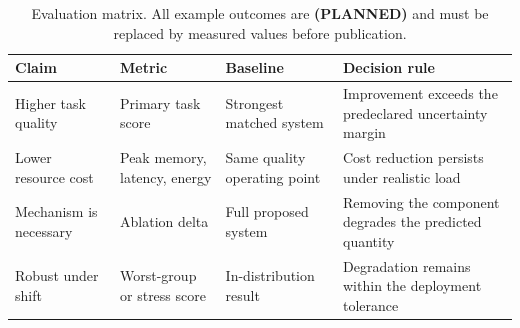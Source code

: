 \begin{table}[htbp]
\centering
\caption{Evaluation matrix. All example outcomes are \textbf{(PLANNED)} and
must be replaced by measured values before publication.}
\label{tab:evaluation-plan}
\small
\renewcommand{\arraystretch}{1.25}
\begin{tabularx}{\textwidth}{@{}L{0.17\textwidth}L{0.21\textwidth}L{0.21\textwidth}Y@{}}
\toprule
Claim & Metric & Baseline & Decision rule \\
\midrule
Higher task quality & Primary task score & Strongest matched system &
Improvement exceeds the predeclared uncertainty margin \\
Lower resource cost & Peak memory, latency, energy & Same quality operating point &
Cost reduction persists under realistic load \\
Mechanism is necessary & Ablation delta & Full proposed system &
Removing the component degrades the predicted quantity \\
Robust under shift & Worst-group or stress score & In-distribution result &
Degradation remains within the deployment tolerance \\
\bottomrule
\end{tabularx}
\end{table}
